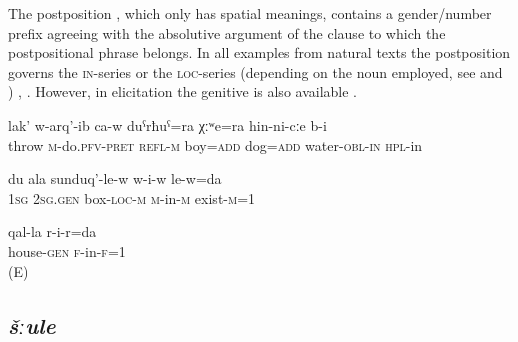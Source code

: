 The postposition , which only has spatial meanings, contains a gender/number prefix agreeing with the absolutive argument of the clause to which the postpositional phrase belongs. In all examples from natural texts the postposition governs the \textsc{in}-series or the \textsc{loc}-series (depending on the noun employed, see  and ) , . However, in elicitation the genitive is also available .
%
\begin{exe}
	\ex
	\begin{xlist}
		\ex	\label{(It) threw the boy and the dog into the water}
		\gll	lak'	w-arq'-ib	ca-w	duˁrħuˁ=ra	χːʷe=ra	hin-ni-cːe b-i  \\
			throw	\textsc{m}-do.\textsc{pfv}-\textsc{pret}	\textsc{refl}-\textsc{m}	boy=\textsc{add}	dog=\textsc{add} water-\textsc{obl}-\textsc{in} \textsc{hpl}-in\\
		\glt	{}

		\ex	\label{Iam inside your box}
		\gll	du	ala	sunduq'-le-w	w-i-w	le-w=da  \\
			1\textsc{sg}	2\textsc{sg}.\textsc{gen}	box-\textsc{loc}-\textsc{m}	\textsc{m}-in-\textsc{m}	exist-\textsc{m}=1\\
		\glt	{}

		\ex	\label{Iaminside the house}
		\gll	qal-la r-i-r=da  \\
			house-\textsc{gen} \textsc{f}-in-\textsc{f}=1\\
		\glt	{} (E)
	\end{xlist}
\end{exe}



\subsection{\textit{šːule} }
\label{ssec:postposition sule}

